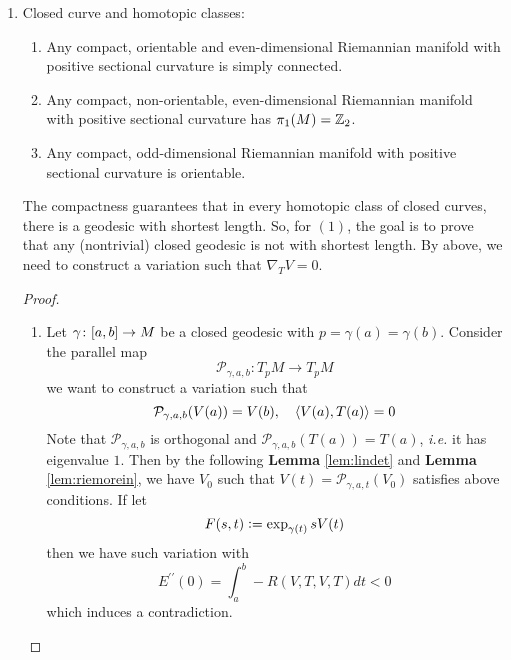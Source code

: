 \begin{enumerate}[label=\Roman{*}.]
	\item Closed curve and homotopic classes:
	\begin{thm}[Synge]
		\begin{enumerate}[label=(\arabic{*})]
			\item Any compact, orientable and even-dimensional Riemannian manifold with positive sectional curvature is simply connected.
			\item Any compact, non-orientable, even-dimensional Riemannian manifold with positive sectional curvature has $\pi_1(M) = \mathbb{Z}_2$.
			\item Any compact, odd-dimensional Riemannian manifold with positive sectional curvature is orientable.
		\end{enumerate}
	\end{thm}
	\begin{rmk}
		The compactness guarantees that in every homotopic class of closed curves, there is a geodesic with shortest length. So, for $(1)$, the goal is to prove that any (nontrivial) closed geodesic is not with shortest length. By above, we need to construct a variation such that $\nabla_TV=0$.
	\end{rmk}
	\begin{proof}
		\begin{enumerate}[label=(\arabic{*})]
			\item Let $\gamma \colon [a,b] \rightarrow M$ be a closed geodesic with $p = \gamma(a) = \gamma(b)$. Consider the parallel map
			\begin{equation*}
				\mathcal{P}_{\gamma,a,b} \colon T_pM \longrightarrow T_pM
			\end{equation*}
			we want to construct a variation such that
			\begin{equation*}
				\mathcal{P}_{\gamma,a,b}(V(a)) = V(b),\quad \left\langle V(a),T(a) \right\rangle = 0
			\end{equation*}
			Note that $\mathcal{P}_{\gamma,a,b}$ is orthogonal and $\mathcal{P}_{\gamma,a,b}(T(a)) =T(a)$, \emph{i.e.} it has eigenvalue $1$. Then by the following \textbf{Lemma} \ref{lem:lindet} and \textbf{Lemma} \ref{lem:riemorein}, we have $V_0$ such that $V(t) = \mathcal{P}_{\gamma,a,t}(V_0)$ satisfies above conditions. If let
			\begin{equation*}
				F(s,t) \vcentcolon= \exp_{\gamma(t)}sV(t)
			\end{equation*}
			then we have such variation with
			\begin{equation*}
				E^{\prime\prime}(0) = \int_a^b -R(V,T,V,T)dt < 0
			\end{equation*}
			which induces a contradiction.


\end{enumerate}
\end{proof}
\end{enumerate}
